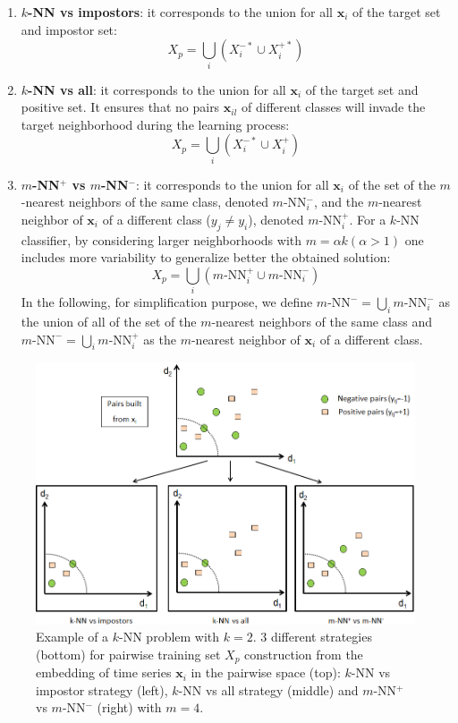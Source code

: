 \begin{enumerate}
	\item \textbf{$k$-NN vs impostors}: it corresponds to the union for all $\textbf{x}_i$ of the target set and impostor set:
		\begin{equation}
			X_p = \bigcup\limits_{i} \left( X_i^{-*} \cup X_i^{+*} \right) 
		\end{equation}
	\item \textbf{$k$-NN vs all}: it corresponds to the union for all $\textbf{x}_i$ of the target set and positive set. It ensures that no pairs $\textbf{x}_{il}$ of different classes will invade the target neighborhood during the learning process:
		\begin{equation}
			X_p = \bigcup\limits_{i} \left( X_i^{-*} \cup X_i^{+} \right) 
		\end{equation}
	
	\item \textbf{$m$-NN$^+$ vs $m$-NN$^-$}: it corresponds to the union for all $\textbf{x}_i$ of the set of the $m$-nearest neighbors of the same class, denoted $m$-NN$^-_i$, and the $m$-nearest neighbor of $\textbf{x}_i$ of a different class ($y_j \neq y_i$), denoted $m$-NN$^+_i$. For a $k$-NN classifier, by considering larger neighborhoods with $m=\alpha k(\alpha>1)$ one includes more variability to generalize better the obtained solution:
		\begin{equation}
			X_p = \bigcup\limits_{i} \left( m\text{-NN}^+_i \cup m\text{-NN}^-_i \right) 
		\end{equation}
	In the following, for simplification purpose, we define $m\text{-NN}^- = \bigcup\limits_{i} m\text{-NN}^-_i$ as the union of all of the set of the $m$-nearest neighbors of the same class and $m\text{-NN}^- = \bigcup\limits_{i} m\text{-NN}^+_i$ as the $m$-nearest neighbor of $\textbf{x}_i$ of a different class.
\end{enumerate}
\begin{figure}[h!]
\centering
\includegraphics[width=0.95\linewidth]{images/Strategy_neighborhood}
\caption{Example of a $k$-NN problem with $k=2$. 3 different strategies (bottom) for pairwise training set $X_p$ construction from the embedding of time series $\textbf{x}_i$ in the pairwise space (top): $k$-NN vs impostor strategy (left), $k$-NN vs all strategy (middle) and $m$-NN$^+$ vs $m$-NN$^-$ (right) with $m=4$.}
\label{fig:Strategy_neighborhood}
\end{figure}
